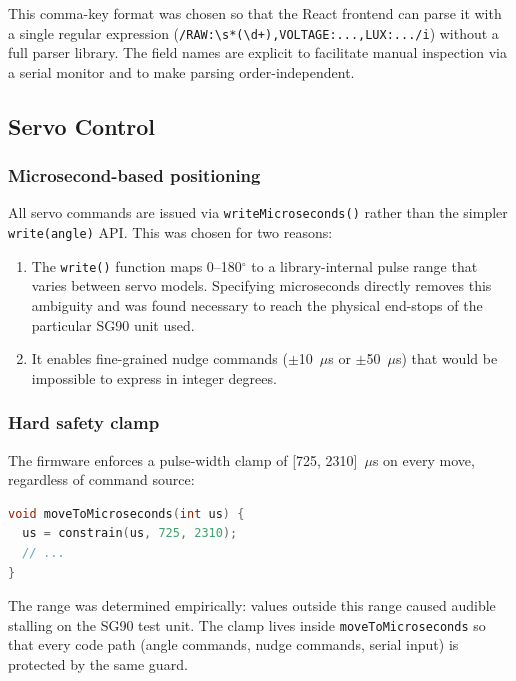 \documentclass[12pt,letterpaper]{article}
\begin{document}
This comma-key format was chosen so that the React frontend can parse it with a
single regular expression (\texttt{/RAW:\textbackslash s*(\textbackslash d+),VOLTAGE:...,LUX:.../i})
without a full parser library. The field names are explicit to facilitate manual
inspection via a serial monitor and to make parsing order-independent.

\subsection{Servo Control}

\subsubsection{Microsecond-based positioning}

All servo commands are issued via \texttt{writeMicroseconds()} rather than the
simpler \texttt{write(angle)} API. This was chosen for two reasons:

\begin{enumerate}
  \item The \texttt{write()} function maps 0–180$^\circ$ to a
        library-internal pulse range that varies between servo models. Specifying
        microseconds directly removes this ambiguity and was found necessary to
        reach the physical end-stops of the particular SG90 unit used.
  \item It enables fine-grained nudge commands ($\pm$10~$\mu$s or $\pm$50~$\mu$s)
        that would be impossible to express in integer degrees.
\end{enumerate}

\subsubsection{Hard safety clamp}

The firmware enforces a pulse-width clamp of [725, 2310]~$\mu$s on every move,
regardless of command source:

\begin{lstlisting}[language=C, caption={Safety clamp on servo pulse width}]
void moveToMicroseconds(int us) {
  us = constrain(us, 725, 2310);
  // ...
}
\end{lstlisting}

The range was determined empirically: values outside this range caused audible
stalling on the SG90 test unit. The clamp lives inside \texttt{moveToMicroseconds}
so that every code path (angle commands, nudge commands, serial input) is
protected by the same guard.
\end{document}
